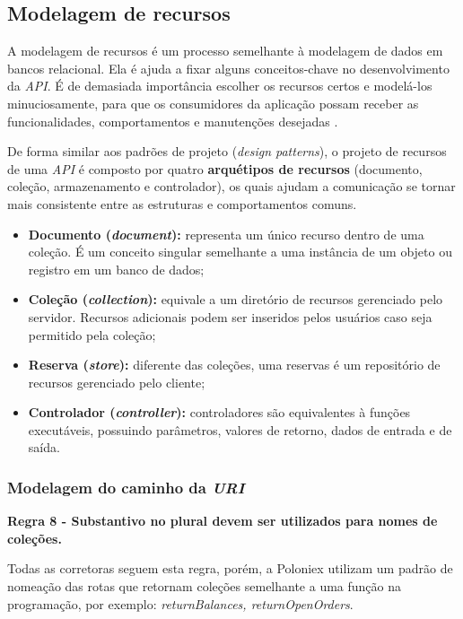 \subsection{Modelagem de recursos}

A modelagem de recursos é um processo semelhante à modelagem de dados em bancos relacional. Ela é ajuda a fixar alguns conceitos-chave no desenvolvimento da \textit{API}.
É de demasiada importância escolher os recursos certos e modelá-los minuciosamente, para que os consumidores da aplicação possam receber as funcionalidades, comportamentos e manutenções desejadas \cite{Subramaniam2014}.

De forma similar aos padrões de projeto (\textit{design patterns}), o projeto de recursos de uma \textit{API} é composto por quatro \textbf{arquétipos de recursos} (documento, coleção, armazenamento e controlador), os quais ajudam a comunicação se tornar mais consistente entre as estruturas e comportamentos comuns.

\begin{itemize}
    \item \textbf{Documento (\textit{document}):} representa um único recurso dentro de uma coleção. É um conceito singular semelhante a uma instância de um objeto ou registro em um banco de dados;
    \item \textbf{Coleção (\textit{collection}):} equivale a um diretório de recursos gerenciado pelo servidor. Recursos adicionais podem ser inseridos pelos usuários caso seja permitido pela coleção;
    \item \textbf{Reserva (\textit{store}):} diferente das coleções, uma reservas é um repositório de recursos gerenciado pelo cliente;
    \item \textbf{Controlador (\textit{controller}):} controladores são equivalentes à funções executáveis, possuindo parâmetros, valores de retorno, dados de entrada e de saída.
\end{itemize}

\subsubsection{Modelagem do caminho da \textit{URI}}

\textbf{Regra 8 - Substantivo no plural devem ser utilizados para nomes de coleções.}

Todas as corretoras seguem esta regra, porém, a Poloniex utilizam um padrão de nomeação das rotas que retornam coleções semelhante a uma função na programação, por exemplo: \textit{returnBalances, returnOpenOrders}.

